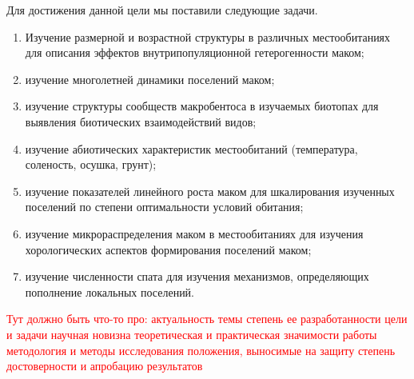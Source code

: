 Для достижения данной цели мы поставили следующие задачи.
  \begin{enumerate}
    \item Изучение размерной и возрастной структуры в различных местообитаниях для описания эффектов внутрипопуляционной гетерогенности маком;
    \item изучение многолетней динамики поселений маком;
    \item изучение структуры сообществ макробентоса в изучаемых биотопах для выявления биотических взаимодействий видов;
    \item изучение абиотических характеристик местообитаний (температура, соленость, осушка, грунт);
    \item изучение показателей линейного роста маком для шкалирования изученных поселений по степени оптимальности условий обитания;
    \item изучение микрораспределения маком в местообитаниях для изучения хорологических аспектов формирования поселений маком;
    \item изучение численности спата для изучения механизмов, определяющих пополнение локальных поселений.
  \end{enumerate}

\textcolor{red}{Тут должно быть что-то про:
актуальность темы
степень ее разработанности
цели и задачи
научная новизна
теоретическая и практическая значимости работы
методология и методы исследования
положения, выносимые на защиту
степень достоверности и апробацию результатов}
